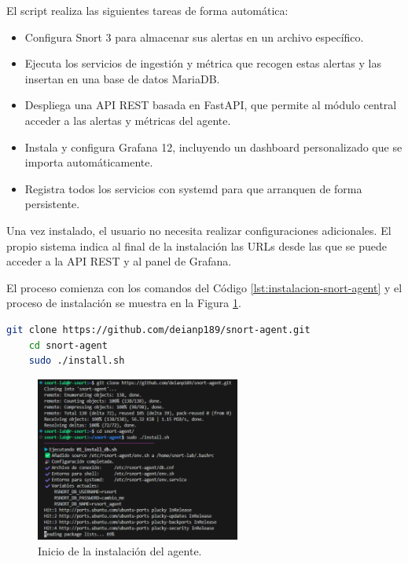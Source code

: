 \documentclass[11pt,a4paper,twoside]{report}
\begin{document}
El script realiza las siguientes tareas de forma automática:

\begin{itemize}
	\item Configura Snort 3 para almacenar sus alertas en un archivo específico.
	\item Ejecuta los servicios de ingestión y métrica que recogen estas alertas y las insertan en una base de datos MariaDB.
	\item Despliega una API REST basada en FastAPI, que permite al módulo central acceder a las alertas y métricas del agente.
	\item Instala y configura Grafana 12, incluyendo un dashboard personalizado que se importa automáticamente.
	\item Registra todos los servicios con systemd para que arranquen de forma persistente.
\end{itemize}

Una vez instalado, el usuario no necesita realizar configuraciones adicionales. El propio sistema indica al final de la instalación las URLs desde las que se puede acceder a la API REST y al panel de Grafana.\newline

El proceso comienza con los comandos del Código \ref{lst:instalacion-snort-agent} y el proceso de instalación se muestra en la Figura \ref{fig:inicio-snort-agent}.

\begin{lstlisting}[language=bash, caption={Comandos de instalación del agente.}, label={lst:instalacion-snort-agent}]
	git clone https://github.com/deianp189/snort-agent.git
	cd snort-agent
	sudo ./install.sh
\end{lstlisting}

\begin{figure}[H]
	\centering
	\includegraphics[width=0.6\textwidth]{install/4.png}
	\caption{Inicio de la instalación del agente.}
	\label{fig:inicio-snort-agent}
\end{figure}
\end{document}
